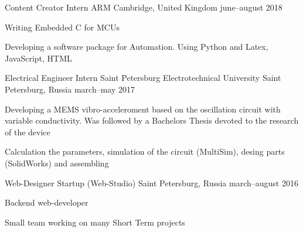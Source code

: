 

\begin{cventries}

  \cventry
  	{Content Creator Intern}
  	{ARM}
  	{Cambridge, United Kingdom}
  	{june--august 2018}
  	{
      \begin{cvitems} %
        \item {Writing Embedded C for MCUs}
        \item {Developing a software package for Automation. Using Python and Latex, JavaScript, HTML}
      \end{cvitems}
  	}

  \cventry
  	{Electrical Engineer Intern}
  	{Saint Petersburg Electrotechnical University}
  	{Saint Petersburg, Russia}
  	{march--may 2017}
  	{
      \begin{cvitems} %
        \item {Developing a MEMS vibro-acceleroment based on the oscillation circuit with variable conductivity. Was followed by a Bachelors Thesis devoted to the research of the device}
        \item {Calculation the parameters, simulation of the circuit  (MultiSim), desing parts (SolidWorks) and assembling}
      \end{cvitems}
  	}

  \cventry
  	{Web-Designer}
  	{Startup (Web-Studio)}
  	{Saint Petersburg, Russia}
  	{march--august 2016}
  	{
      \begin{cvitems} %
        \item {Backend web-developer}%
        \item {Small team working on many Short Term projects}
      \end{cvitems}
  	}


\end{cventries}
